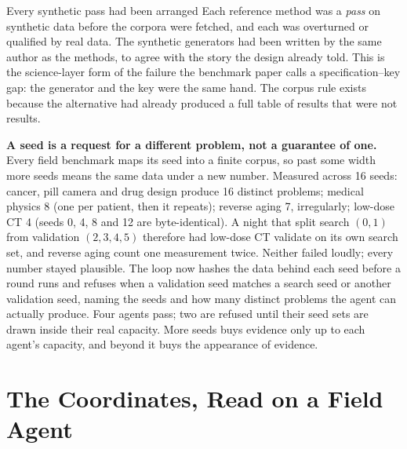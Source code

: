 \documentclass[11pt]{article}
\theoremstyle{definition}
\begin{document}
\begin{cautionbox}{Every synthetic pass had been arranged}
Each reference method was a \emph{pass} on synthetic data before the corpora were fetched, and each was overturned or qualified by real data. The synthetic generators had been written by the same author as the methods, to agree with the story the design already told. This is the science-layer form of the failure the benchmark paper calls a specification--key gap: the generator and the key were the same hand. The corpus rule exists because the alternative had already produced a full table of results that were not results.
\end{cautionbox}

\textbf{A seed is a request for a different problem, not a guarantee of one.} Every field benchmark maps its seed into a finite corpus, so past some width more seeds means the same data under a new number. Measured across 16 seeds: cancer, pill camera and drug design produce 16 distinct problems; medical physics 8 (one per patient, then it repeats); reverse aging 7, irregularly; low-dose CT 4 (seeds 0, 4, 8 and 12 are byte-identical). A night that split search $(0,1)$ from validation $(2,3,4,5)$ therefore had low-dose CT validate on its own search set, and reverse aging count one measurement twice. Neither failed loudly; every number stayed plausible. The loop now hashes the data behind each seed before a round runs and refuses when a validation seed matches a search seed or another validation seed, naming the seeds and how many distinct problems the agent can actually produce. Four agents pass; two are refused until their seed sets are drawn inside their real capacity. More seeds buys evidence only up to each agent's capacity, and beyond it buys the appearance of evidence.

\section{The Coordinates, Read on a Field Agent}\label{sec:coords}
\end{document}
